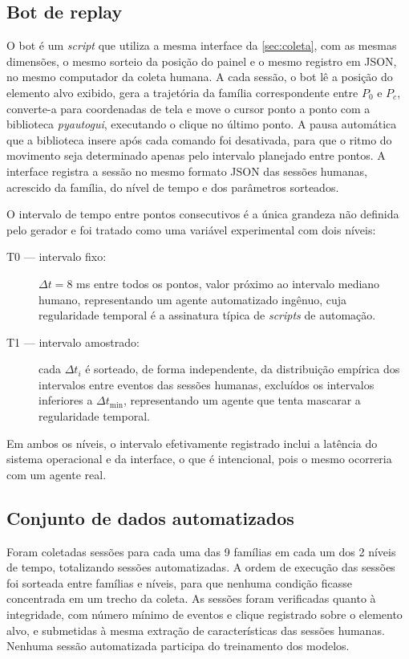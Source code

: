 \subsection{Bot de replay}
\label{subsec:replay}

O bot é um \textit{script} que utiliza a mesma interface da \autoref{sec:coleta}, com as mesmas dimensões, o mesmo sorteio da posição do painel e o mesmo registro em JSON, no mesmo computador da coleta humana. A cada sessão, o bot lê a posição do elemento alvo exibido, gera a trajetória da família correspondente entre $P_0$ e $P_c$, converte-a para coordenadas de tela e move o cursor ponto a ponto com a biblioteca \textit{pyautogui}, executando o clique no último ponto. A pausa automática que a biblioteca insere após cada comando foi desativada, para que o ritmo do movimento seja determinado apenas pelo intervalo planejado entre pontos. A interface registra a sessão no mesmo formato JSON das sessões humanas, acrescido da família, do nível de tempo e dos parâmetros sorteados.

O intervalo de tempo entre pontos consecutivos é a única grandeza não definida pelo gerador e foi tratado como uma variável experimental com dois níveis:
\begin{description}
    \item[T0 --- intervalo fixo:] $\Delta t = 8$ ms entre todos os pontos, valor próximo ao intervalo mediano humano, representando um agente automatizado ingênuo, cuja regularidade temporal é a assinatura típica de \textit{scripts} de automação.
    \item[T1 --- intervalo amostrado:] cada $\Delta t_i$ é sorteado, de forma independente, da distribuição empírica dos intervalos entre eventos das sessões humanas, excluídos os intervalos inferiores a $\Delta t_{\min}$, representando um agente que tenta mascarar a regularidade temporal.
\end{description}
Em ambos os níveis, o intervalo efetivamente registrado inclui a latência do sistema operacional e da interface, o que é intencional, pois o mesmo ocorreria com um agente real.

\subsection{Conjunto de dados automatizados}

Foram coletadas  sessões para cada uma das 9 famílias em cada um dos 2 níveis de tempo, totalizando  sessões automatizadas. A ordem de execução das sessões foi sorteada entre famílias e níveis, para que nenhuma condição ficasse concentrada em um trecho da coleta. As sessões foram verificadas quanto à integridade, com número mínimo de eventos e clique registrado sobre o elemento alvo, e submetidas à mesma extração de características das sessões humanas. Nenhuma sessão automatizada participa do treinamento dos modelos.

